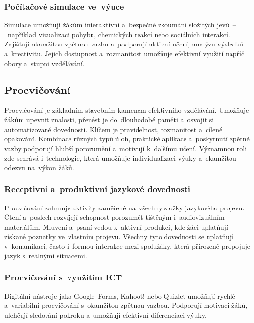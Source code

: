 \documentclass[male,czech,api_bc]{kitheses}
\begin{document}
\newpage

\subsubsection{Počítačové simulace ve~výuce}

Simulace umožňují žákům interaktivní a~bezpečné zkoumání složitých jevů~--~například vizualizací pohybu, chemických reakcí nebo sociálních interakcí. Zajišťují okamžitou zpětnou vazbu a~podporují aktivní učení, analýzu výsledků a~kreativitu. Jejich dostupnost a~rozmanitost umožňuje efektivní využití napříč obory a~stupni vzdělávání.

\subsection{Procvičování}

Procvičování je základním stavebním kamenem efektivního vzdělávání. Umožňuje žákům upevnit znalosti, přenést je do~dlouhodobé paměti a~osvojit si automatizované dovednosti. Klíčem je pravidelnost, rozmanitost a~cílené opakování. Kombinace různých typů úloh, praktické aplikace a~poskytnutí zpětné vazby podporují hlubší porozumění a~motivují k~dalšímu učení. Významnou roli zde sehrává i~technologie, která umožňuje individualizaci výuky a~okamžitou odezvu na~výkon žáků.

\subsubsection{Receptivní a~produktivní jazykové dovednosti}

Procvičování zahrnuje aktivity zaměřené na~všechny složky jazykového projevu. Čtení a~poslech rozvíjejí schopnost porozumět tištěným i~audiovizuálním materiálům. Mluvení a~psaní vedou k~aktivní produkci, kde žáci uplatňují získané poznatky ve~vlastním projevu. Všechny tyto dovednosti se uplatňují v~komunikaci, často i~formou interakce mezi spolužáky, která přirozeně propojuje jazyk s~reálnými situacemi.

\subsubsection{Procvičování s~využitím ICT}

Digitální nástroje jako Google~Forms, Kahoot! nebo Quizlet umožňují rychlé a~variabilní procvičování s~okamžitou zpětnou vazbou. Podporují motivaci žáků, ulehčují sledování pokroku a~umožňují efektivní diferenciaci výuky.
\end{document}
